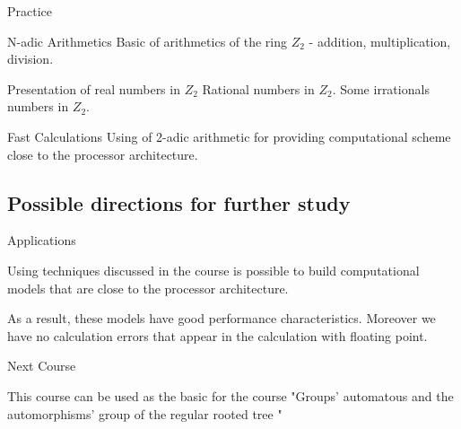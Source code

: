 \begin{frame}{Practice}
\pause
\begin{block}{N-adic Arithmetics}
\pause
Basic of arithmetics of the ring $Z_2$ - addition, multiplication, division. 

\end{block}
\pause
\begin{block}{Presentation of real numbers in $Z_2$}
\pause
Rational numbers in $Z_2$. Some irrationals numbers in $Z_2$.
\end{block}
\pause
\begin{block}{Fast Calculations}
\pause
Using of 2-adic arithmetic for providing computational scheme close to the processor architecture.

\end{block}


\end{frame}
\subsection{Possible directions for further study}

\begin{frame}{Applications}

Using techniques discussed in the course is possible to build computational models that are close to the processor architecture.
\pause

 As a result, these models have good performance characteristics. Moreover we have no calculation errors that appear in the calculation with floating point.

\end{frame}



\begin{frame}{Next Course}

This course can be used as the basic for the course "Groups' automatous and the automorphisms' group of the regular
rooted tree "




\end{frame}




